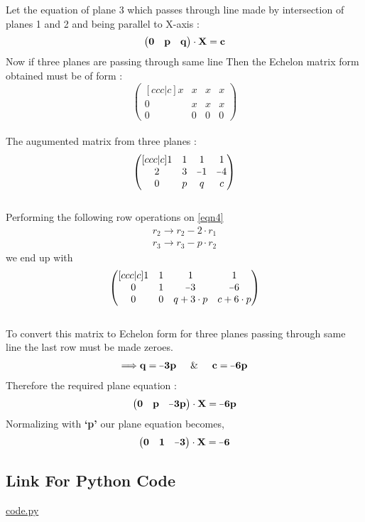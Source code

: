\documentclass[twocolumn]{article}
\let\vec\mathbf
\newcommand*{\matminus}{%
  \leavevmode
  \hphantom{0}%
  \llap{%
    \settowidth{\dimen0 }{$0$}%
    \resizebox{1.1\dimen0 }{\height}{$-$}%
  }%
}
\begin{document}
Let the equation of plane 3 which passes through line made by intersection of planes 1 and 2 and being parallel to X-axis : 
\begin{equation}
\begin{pmatrix}{\bf0}&{\bf p}&{\bf q}\end{pmatrix}\cdot{\bf \vec{X}} = \bf c \label{eqn3}
\end{equation}
Now if three planes are passing through same line Then the Echelon matrix form obtained must be of form :
\begin{equation}
\begin{pmatrix}[ccc|c]
 x & x & x & x\\  0 & x & x & x \\ 0 & 0 & 0 & 0
\end{pmatrix} \nonumber
\end{equation}
\\The augumented matrix from three planes :
\begin{equation}
\begin{pmatrix}[ccc|c]
 1 & 1 & 1 & 1\\  2 & 3 & \matminus1 & \matminus4 \\ 0 & p & q & c \label{eqn4}
\end{pmatrix} 
\end{equation}
\\ Performing the following row operations on
\eqref{eqn4}
\begin{align}
r_2 \rightarrow r_2-2\cdot r_1  \label{eq5} \\
r_3 \rightarrow r_3-p\cdot r_2 \label{eq6}
\end{align}
we end up with
\begin{equation}
\begin{pmatrix}[ccc|c]
 1 & 1 & 1 & 1\\  0 & 1 & \matminus3 & \matminus6 \\ 0 & 0 & q +3\cdot p & c +6\cdot p
\end{pmatrix} \label{eq7}
\end{equation}
\\To convert this matrix to Echelon form for three planes passing through same line the last row must be made zeroes.
\begin{align}
\bf \Longrightarrow q=\matminus3p \hspace*{0.5cm}\&\hspace*{0.5cm} c=\matminus6p \label{eqn8}
\end{align}
Therefore the required plane equation :
\begin{align}
\begin{pmatrix}{\bf0}&{\bf p}&{\bf \matminus 3p }\end{pmatrix}\cdot{\bf \vec{X}} = \bf \matminus6p \label{eqn9}
\end{align}
Normalizing  with {\bf `p'} our plane equation becomes,
\begin{align}
\begin{pmatrix}{\bf0}&{\bf 1}&{\bf \matminus 3 }\end{pmatrix}\cdot{\bf \vec{X}} = \bf \matminus6 \label{eqn10}
\end{align}
\subsection*{Link For Python Code}
\href{https://github.com/vikramealleti/EE5600/blob/master/Assignment%201/Linalgassignment.py}{code.py}
\end{document}
